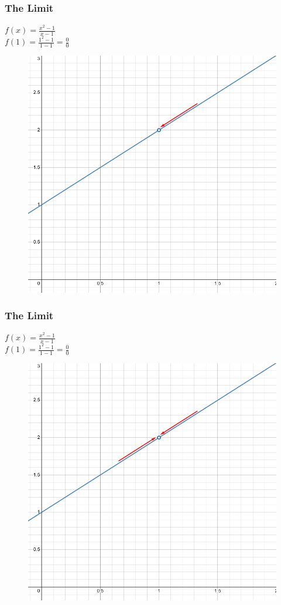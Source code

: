 \documentclass{beamer}
\def\limfunc{\frac{x^2-1}{x-1}}
\begin{document}
    \begin{frame}
        \frametitle{The Limit}
        \(f(x)=\limfunc\)\\
        \(f(1)=\frac{1^2-1}{1-1}=\frac{0}{0}\)\\[12pt]
        \begin{figure}
            \centering
            \includegraphics[width=0.6\linewidth]{include/images/limit_3.png}
        \end{figure}
    \end{frame}

    \begin{frame}
        \frametitle{The Limit}
        \(f(x)=\limfunc\)\\
        \(f(1)=\frac{1^2-1}{1-1}=\frac{0}{0}\)\\[12pt]
        \begin{figure}
            \centering
            \includegraphics[width=0.6\linewidth]{include/images/limit_4.png}
        \end{figure}
    \end{frame}
\end{document}
